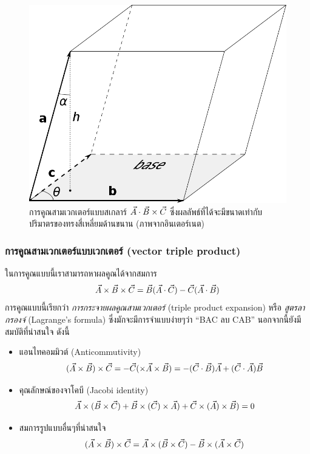 \begin{figure}%
\centering
\includegraphics[width=0.8\columnwidth]{800px-Parallelepiped_volume.svg.png}
\caption{การคูณสามเวกเตอร์แบบสเกลาร์ $\vec{A}\cdot\vec{B}\times\vec{C}$ ซึ่งผลลัพธ์ที่ได้จะมีขนาดเท่ากับปริมาตรของทรงสี่เหลี่ยมด้านขนาน (ภาพจากอินเตอร์เนต)}
\label{fig3}
\end{figure}

\subsubsection{การคูณสามเวกเตอร์แบบเวกเตอร์ (vector triple product)}

ในการคูณแบบนี้เราสามารถหาผลคูณได้จากสมการ
\begin{equation}\label{VectorTripleProd}
\vec{A}\times\vec{B}\times\vec{C} = \vec{B}(\vec{A}\cdot\vec{C}) - \vec{C}(\vec{A}\cdot\vec{B})
\end{equation}
การคูณแบบนี้เรียกว่า \textit{การกระจายผลคูณสามเวกเตอร์} (triple product expansion) หรือ \textit{สูตรลากรองจ์} (Lagrange's formula) ซึ่งมักจะมีการจำแบบง่ายๆว่า ``BAC ลบ CAB'' นอกจากนี้ยังมีสมบัติที่น่าสนใจ ดังนี้
\begin{itemize}
    \item แอนไทคอมมิวต์ (Anticommutivity)
        \begin{equation}\label{VectorTripleProdAntiCommute}
            (\vec{A}\times\vec{B})\times\vec{C} = - \vec{C}(\times\vec{A}\times\vec{B}) = - (\vec{C}\cdot\vec{B})\vec{A} + (\vec{C}\cdot\vec{A})\vec{B}
        \end{equation}
    \item คุณลักษณ์ของจาโคบี (Jacobi identity)
        \begin{equation}\label{VectorTripleProdJacobiIden}
            \vec{A}\times(\vec{B}\times\vec{C}) + \vec{B}\times(\vec{C})\times\vec{A}) + \vec{C}\times(\vec{A})\times\vec{B}) = 0
        \end{equation}
    \item สมการรูปแบบอื่นๆที่น่าสนใจ
        \begin{equation}\label{VectorTripleProdOthers}
            (\vec{A}\times\vec{B})\times\vec{C} = \vec{A}\times(\vec{B}\times\vec{C}) - \vec{B}\times(\vec{A}\times\vec{C})
        \end{equation}
\end{itemize}

